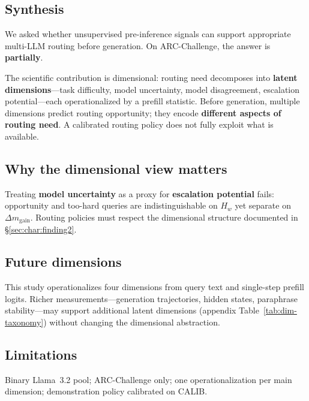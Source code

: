 
\subsection{Synthesis}
\label{sec:disc:synthesis}

We asked whether unsupervised pre-inference signals can support appropriate multi-LLM routing before generation.
On ARC-Challenge, the answer is \textbf{partially}.

The scientific contribution is dimensional: routing need decomposes into \textbf{latent dimensions}---task difficulty, model uncertainty, model disagreement, escalation potential---each operationalized by a prefill statistic.
Before generation, multiple dimensions predict routing opportunity; they encode \textbf{different aspects of routing need}.
A calibrated routing policy does not fully exploit what is available.

\subsection{Why the dimensional view matters}
\label{sec:disc:failures}

Treating \textbf{model uncertainty} as a proxy for \textbf{escalation potential} fails: opportunity and too-hard queries are indistinguishable on $H_w$ yet separate on $\Delta m_{\mathrm{gain}}$.
Routing policies must respect the dimensional structure documented in \S\ref{sec:char:finding2}.

\subsection{Future dimensions}
\label{sec:disc:future}

This study operationalizes four dimensions from query text and single-step prefill logits.
Richer measurements---generation trajectories, hidden states, paraphrase stability---may support additional latent dimensions (appendix Table~\ref{tab:dim-taxonomy}) without changing the dimensional abstraction.

\subsection{Limitations}
\label{sec:disc:limits}

Binary Llama~3.2 pool; ARC-Challenge only; one operationalization per main dimension; demonstration policy calibrated on CALIB.
